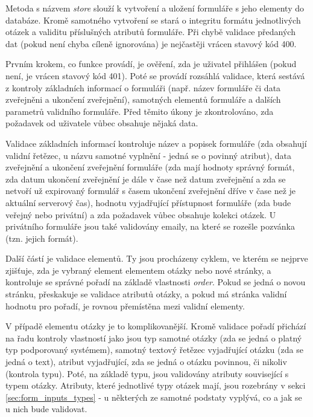 			\label{sec:form_store}
			Metoda s názvem \textit{store} slouží k vytvoření a uložení formuláře s jeho elementy do databáze. Kromě samotného vytvoření se stará o integritu formátu jednotlivých otázek a validitu příslušných atributů formuláře. Při chybě validace předaných dat (pokud není chyba cíleně ignorována) je nejčastěji vrácen stavový kód 400.
			
			Prvním krokem, co funkce provádí, je ověření, zda je uživatel přihlášen (pokud není, je vrácen stavový kód 401). Poté se provádí rozsáhlá validace, která sestává z kontroly základních informací o formuláři (např. název formuláře či data zveřejněni a ukončení zveřejnění), samotných elementů formuláře a dalších parametrů validního formuláře. Před těmito úkony je zkontrolováno, zda požadavek od uživatele vůbec obsahuje nějaká data.
			
			Validace základních informací kontroluje název a popisek formuláře (zda obsahují validní řetězec, u názvu samotné vyplnění - jedná se o povinný atribut), data zveřejnění a ukončení zveřejnění formuláře (zda mají hodnoty správný formát, zda datum ukončení zveřejnění je dále v čase než datum zveřejnění a zda se netvoří už expirovaný formulář s časem ukončení zveřejnění dříve v čase než je aktuální serverový čas), hodnotu vyjadřující přístupnost formuláře (zda bude veřejný nebo privátní) a zda požadavek vůbec obsahuje kolekci otázek. U privátního formuláře jsou také validovány emaily, na které se rozešle pozvánka (tzn. jejich formát).
			
			Další částí je validace elementů. Ty jsou procházeny cyklem, ve kterém se nejprve zjišťuje, zda je vybraný element elementem otázky nebo nové stránky, a kontroluje se správné pořadí na základě vlastnosti \textit{order}. Pokud se jedná o novou stránku, přeskakuje se validace atributů otázky, a pokud má stránka validní hodnotu pro pořadí, je rovnou přemístěna mezi validní elementy. 
			
			V případě elementu otázky je to komplikovanější. Kromě validace pořadí přichází na řadu kontroly vlastností jako jsou typ samotné otázky (zda se jedná o platný typ podporovaný systémem), samotný textový řetězec vyjadřující otázku (zda se jedná o text), atribut vyjadřující, zda se jedná o otázku povinnou, či nikoliv (kontrola typu). Poté, na základě typu, jsou validovány atributy související s typem otázky. Atributy, které jednotlivé typy otázek mají, jsou rozebrány v sekci \ref{sec:form_inputs_types} - u některých ze samotné podstaty vyplývá, co a jak se u nich bude validovat. 
			
